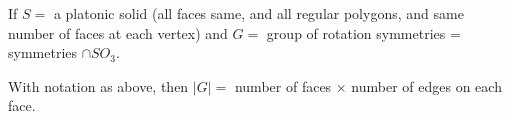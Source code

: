 \begin{definition}
    If \(S = \) a platonic solid (all faces same, and all regular polygons, and same number of faces at each vertex) and \(G = \) group of rotation symmetries = symmetries \(\cap SO_3\).
\end{definition}

\begin{proposition}
    With notation as above, then \(|G| = \) number of faces \(\times \) number of edges on each face.
\end{proposition}